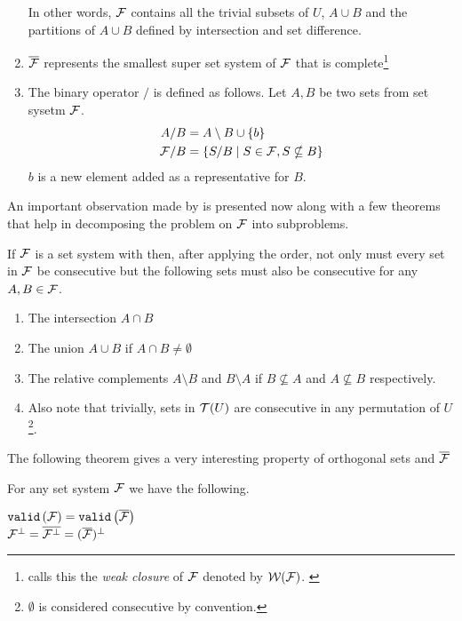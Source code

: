 \begin{definition}
\begin{enumerate}
    In other words, ${\cal F}$ contains all the trivial
    subsets of $U$, $A \cup B$ and the partitions of $A \cup B$
    defined by intersection and set difference.

  \item $\overline{{\cal F}}$ represents the smallest super set system of
    ${\cal F}$ that is complete\footnote{\cite[Def.~3.2]{mcc04} calls
      this the {\em weak closure} of ${\cal F}$ denoted by
      ${\cal W}({\cal F})$. \label{mcc3}}

  \item \label{def::slashop} The binary operator $/$ is defined as
    follows. Let $A, B$ be two sets from set sysetm ${\cal F}$.
    \begin{align*}
      A/B &= A \setminus B \cup \{b\}\\
      {\cal F}/B &= \{ S/B \mid S \in {\cal F}, S \nsubseteq B \}
    \end{align*}
    $b$ is a new element added as a representative for $B$.
 \end{enumerate}
  \dstop
\end{definition}


An important observation made by \cite{mm96} is presented now along
with a few theorems that help in decomposing the \COP problem on ${\cal F}$
into subproblems.

\begin{observation}[{\cite[Sec.~3]{mm96}}]
  If ${\cal F}$ is a set system with \COP then, after applying the \COP
  order, not only must every set in ${\cal F}$ be consecutive but the
  following sets must also be consecutive for any $A, B \in {\cal F}$.
\begin{enumerate}
  \item The intersection $A \cap B$ 
  \item The union $A \cup B$ if $A \cap B \ne \emptyset$
  \item The relative complements $A \setminus B$ and $B \setminus A$
    if $B \nsubseteq A$ and $A \nsubseteq B$ respectively.
  \item Also note that trivially, sets in ${\cal T}(U)$ are consecutive in
    any permutation of $U$\footnote{$\emptyset$ is considered
      consecutive by convention.}.
\end{enumerate}
\end{observation}

The following theorem gives a very interesting property of orthogonal
sets and $\overline{{\cal F}}$

\begin{theoremsansproof}[{\cite[Th.~3,6]{mm96}}]
  \label{th:validcop}
  For any set system ${\cal F}$ we have the following. \par
  \centering
    ${\tt valid}\left({\cal F}\right) = {\tt valid}\left(\overline{{\cal F}}\right)$ \\
    ${\cal F}^{\bot} = \overline{{\cal F}^{\bot}} = (\overline{{\cal F}})^{\bot}$
\end{theoremsansproof}

